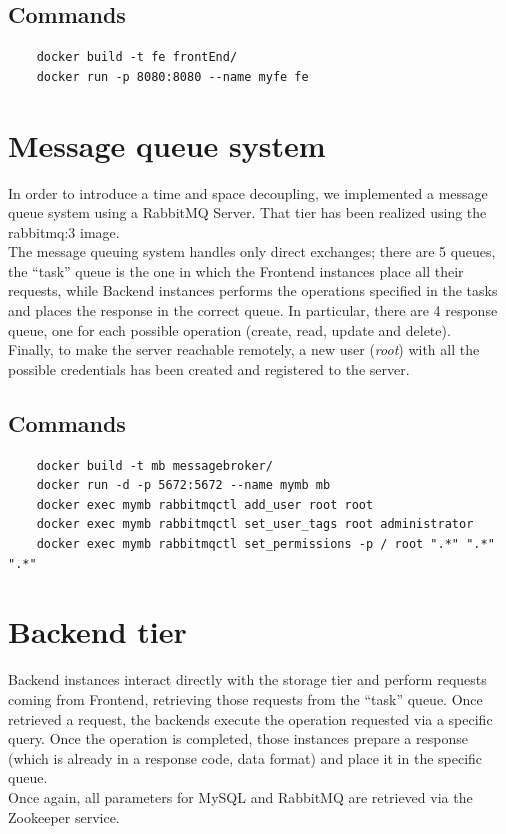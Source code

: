 \documentclass{article}
\begin{document}
\subsection{Commands}
\begin{verbatim}
    docker build -t fe frontEnd/
    docker run -p 8080:8080 --name myfe fe
\end{verbatim}




\section{Message queue system}
In order to introduce a time and space decoupling, we implemented a message queue system using a RabbitMQ Server. That tier has been realized using the rabbitmq:3 image.\\
The message queuing system handles only direct exchanges; there are 5 queues, the “task” queue is the one in which the Frontend instances place all their requests, while Backend instances performs the operations specified in the tasks and places the response in the correct queue. In particular, there are 4 response queue, one for each possible operation (create, read, update and delete). \\
Finally, to make the server reachable remotely, a new user (\textit{root}) with all the possible credentials has been created and registered to the server.
\subsection{Commands}
\begin{verbatim}
    docker build -t mb messagebroker/
    docker run -d -p 5672:5672 --name mymb mb
    docker exec mymb rabbitmqctl add_user root root
    docker exec mymb rabbitmqctl set_user_tags root administrator
    docker exec mymb rabbitmqctl set_permissions -p / root ".*" ".*" ".*"
\end{verbatim}




\section{Backend tier}
Backend instances interact directly with the storage tier and perform requests coming from Frontend, retrieving those requests from the “task” queue. Once retrieved a request, the backends execute the operation requested via a specific query. Once the operation is completed, those instances prepare a response (which is already in a response code, data format) and place it in the specific queue.\\
Once again, all parameters for MySQL and RabbitMQ are retrieved via the Zookeeper service.
\end{document}
